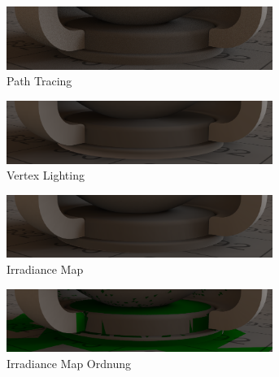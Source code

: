 	\begin{figure}[h]
		\begin{subfigure}[t]{\textwidth}
			\center
			\includegraphics[width=0.95\textwidth]{pic/irrmap-shaderball_e2-ref.png}
			\caption{Path Tracing}
		\end{subfigure}
		\begin{subfigure}[t]{\textwidth}
			\center
			\includegraphics[width=0.95\textwidth]{pic/irrmap-shaderball_e2-vmap.png}
			\caption{Vertex Lighting}
		\end{subfigure}
		\begin{subfigure}[t]{\textwidth}
			\center
			\includegraphics[width=0.95\textwidth]{pic/irrmap-shaderball_e2-irrmap.png}
			\caption{Irradiance Map}
		\end{subfigure}
		\begin{subfigure}[t]{\textwidth}
			\center
			\includegraphics[width=0.95\textwidth]{pic/irrmap-shaderball_e2-irrmap-order.png}
			\caption{Irradiance Map Ordnung}
		\end{subfigure}
		\caption{}
	\end{figure}

